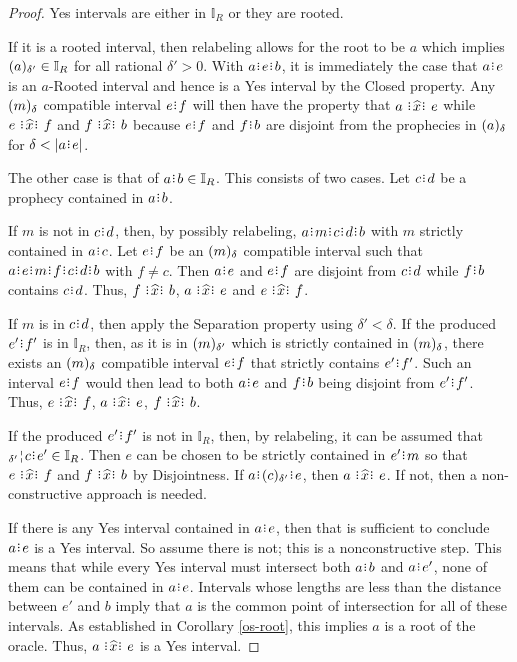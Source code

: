 \documentclass[12pt]{article}
\begin{document}
\begin{proof}
    Yes intervals are either in $\mathbb{I}_R$ or they are rooted. 
    
    If it is a rooted interval, then relabeling allows for the root to be $a$ which implies $\halo[\delta']{a} \in \mathbb{I}_R$ for all rational $\delta' >0$. With $a\rint e\rint b$, it is immediately the case that $a\rint e$ is an $a$-Rooted interval and hence is a Yes interval by the Closed property. Any $\halo{m}$ compatible interval $e\rint f$ will then have the property that $a \xora e$ while \sout{$e\xora f$} and \sout{$f\xora b$} because $e\rint f$ and $f\rint b$ are disjoint from the prophecies in $\halo{a}$ for $\delta < |a\rint e|$.
 
    The other case is that of $a\rint b \in \mathbb{I}_R$. This consists of two cases. Let $c\rint d$ be a prophecy contained in $a\rint b$. 
    
    If $m$ is not in $c\rint d$, then, by possibly relabeling, $a\rint m\rint c\rint d\rint b$ with $m$ strictly contained in $a\rint c$.  Let $e\rint f$ be an $\halo{m}$ compatible interval such that $a\rint e\rint m\rint f\rint c\rint d\rint b$ with $f \neq c$. Then $a\rint e$ and $e\rint f$ are disjoint from $c\rint d$ while $f\rint b$ contains $c\rint d$. Thus, $f \xora b$, \sout{$a\xora e$} and \sout{$e\xora f$}.

    If $m$ is in $c\rint d$, then apply the Separation property using  $\delta' < \delta$. If the produced $e'\rint f'$ is in $\mathbb{I}_R$, then, as it is in $\halo[\delta']{m}$ which is strictly contained in $\halo{m}$, there exists an $\halo{m}$ compatible interval $e\rint f$ that strictly contains $e'\rint f'$. Such an interval $e\rint f$ would then lead to both $a\rint e$ and $f\rint b$ being disjoint from $e'\rint f'$. Thus, $e \xora f$, \sout{$a\xora e$}, \sout{$f\xora b$}.

    If the produced $e'\rint f'$ is not in $\mathbb{I}_R$, then, by relabeling, it can be assumed that $\fuzbleft[\delta']{c}\rint e' \in \mathbb{I}_R$. Then $e$ can be chosen to be strictly contained in $e'\rint m$ so that \sout{$e\xora f$} and \sout{$f\xora b$} by Disjointness. If $a\rint \halo[\delta']{c}\rint e$, then $a \xora e$. If not, then a non-constructive approach is needed.

    If there is any Yes interval contained in $a\rint e$, then that is sufficient to conclude $a\rint e$ is a Yes interval. So assume there is not; this is a nonconstructive step. This means that while every Yes interval must intersect both $a\rint b$ and $a\rint e'$, none of them can be contained in $a\rint e$. Intervals whose lengths are less than the distance between $e'$ and $b$ imply that $a$ is the common point of intersection for all of these intervals. As established in Corollary \ref{os-root}, this implies $a$ is a root of the oracle. Thus, $a \xora e$ is a Yes interval. 

\end{proof}
\end{document}
